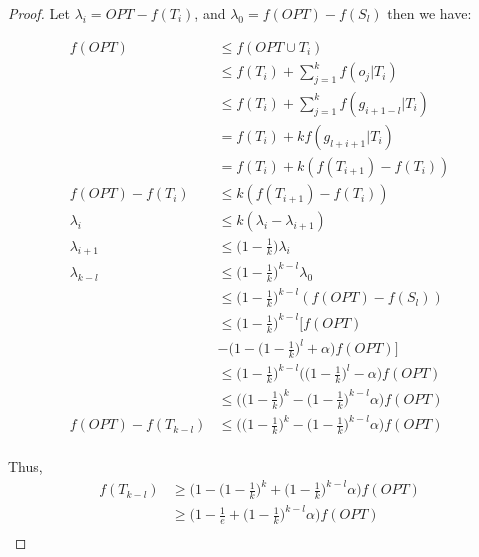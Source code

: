 \documentclass{article}
\begin{document}
\begin{proof}
    
    Let  $\lambda_i = OPT - f(T_i)$, and $\lambda_0 = f(OPT) - f(S_l)$ then we have:
    
    $$\begin{aligned}
    f(OPT)  &\leq f(OPT \cup T_i)\ \\%
            &\leq f(T_i) + \sum_{j = 1}^{k}f(o_j|T_i) \\
            &\leq f(T_i) + \sum_{j = 1}^k f(g_{i+1 - l}|T_i) \\%
            &= f(T_i) + k f(g_{l+i+1} | T_i) \\
            &= f(T_i) + k (f(T_{i + 1}) - f(T_i)) \\
        f(OPT) - f(T_i) &\leq  k (f(T_{i + 1}) - f(T_i)) \\
        \lambda_i &\leq  k (\lambda_{i} - \lambda_{i + 1}) \\
        \lambda_{i + 1} &\leq  \Big(1 - \frac{1}{k}\Big) \lambda_{i} \\
        \lambda_{k - l} &\leq \Big(1 - \frac{1}{k}\Big) ^ {k - l} \lambda_{0} \\
        &\leq \Big(1 - \frac{1}{k}\Big) ^ {k - l} (f(OPT) - f(S_l)) \\
        &\leq \Big(1 - \frac{1}{k}\Big) ^ {k - l} \Big[f(OPT)  \\
        & - \Big(1 - \Big(1 - \frac{1}{k}\Big)^l + \alpha\Big)f(OPT)\Big] \\
        &\leq \Big(1 - \frac{1}{k}\Big) ^ {k - l}\Big(\Big(1 - \frac{1}{k}\Big)^{l} - \alpha\Big)f(OPT) \\
        &\leq \Big(\Big(1 - \frac{1}{k}\Big)^{k} - \Big(1 - \frac{1}{k}\Big)^{k-l}\alpha\Big)f(OPT) \\
    f(OPT) - f(T_{k-l})    &\leq \Big(\Big(1 - \frac{1}{k}\Big)^{k} - \Big(1 - \frac{1}{k}\Big)^{k-l}\alpha\Big)f(OPT) \\
    \end{aligned}$$

Thus,
    $$\begin{aligned}
    f(T_{k-l})    &\geq \Big(1 -\Big(1 - \frac{1}{k}\Big)^{k} + \Big(1 - \frac{1}{k}\Big)^{k-l}\alpha\Big)f(OPT) \\
                &\geq \Big(1 -\frac{1}{e} + \Big(1 - \frac{1}{k}\Big)^{k-l}\alpha\Big)f(OPT)\\
    \end{aligned}$$

\end{proof}
\end{document}
